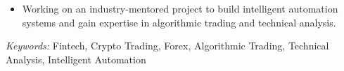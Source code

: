 
\nointent
\begin{itemize}
    \item Working on an industry-mentored project to build intelligent automation systems and gain expertise in algorithmic trading and technical analysis.
\end{itemize}

\nointent
\textit{Keywords:} Fintech, Crypto Trading, Forex, Algorithmic Trading, Technical Analysis, Intelligent Automation

